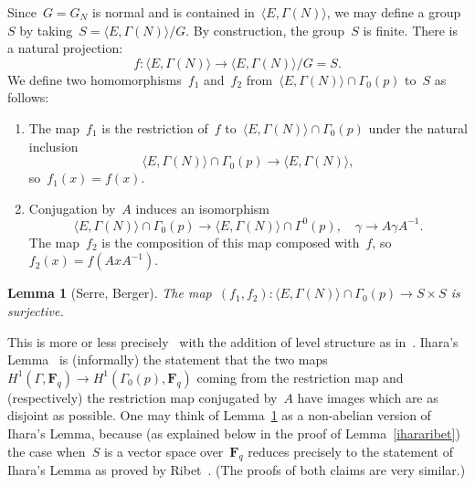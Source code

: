 \documentclass[10pt]{amsart}
\def\F{\mathbf{F}}
\newtheorem{lemma}[subsubsection]{Lemma}
\theoremstyle{remark}
\numberwithin{equation}{subsection}
\begin{document}
Since~$G = G_N$ is normal and is contained in~$\langle E,\Gamma(N)\rangle$, 
we may define a group~$S$ by taking~$S = \langle E,\Gamma(N) \rangle/G$.
By construction, the group~$S$
is finite.  There is a natural projection:
$$f:\langle E,\Gamma(N) \rangle \rightarrow \langle E,\Gamma(N) \rangle/G = S.$$
We define
 two homomorphisms~$f_1$ and~$f_2$ from~$\langle E,\Gamma(N) \rangle  \cap \Gamma_0(p)$ to~$S$ as follows:
\begin{enumerate}
\item The map~$f_1$ is the restriction of~$f$ to~$\langle E,\Gamma(N) \rangle  \cap \Gamma_0(p)$ under the natural
inclusion
$$\langle E,\Gamma(N) \rangle  \cap \Gamma_0(p) \rightarrow \langle E,\Gamma(N) \rangle,$$
so~$f_1(x) = f(x)$.
\item Conjugation by~$A$ induces an isomorphism
$$ \langle E,\Gamma(N) \rangle  \cap \Gamma_0(p) \rightarrow  \langle E,\Gamma(N) \rangle  \cap \Gamma^0(p), \quad
\gamma \longrightarrow A \gamma A^{-1}. $$
The map~$f_2$ is the composition of this map composed with~$f$, so~$f_2(x) = f(AxA^{-1})$. 
\end{enumerate}


\begin{lemma}[Serre, Berger] \label{serreberger}
The map~$(f_1,f_2): \langle E, \Gamma(N)\rangle \cap \Gamma_0(p) \rightarrow S \times S$
is surjective.
\end{lemma}

This is more or less precisely~\cite[Theorem~3]{SerreThompson}
with the addition of
level structure  as in~\cite{Berger}. Ihara's Lemma~\cite{RibetICM} is (informally) the statement
that the two maps~$H^1(\Gamma,\F_q) \rightarrow H^1(\Gamma_0(p),\F_q)$ coming from the restriction map
and (respectively) the restriction map conjugated by~$A$ have images which are as disjoint as possible.
One may think of Lemma~\ref{serreberger}
as a non-abelian version of Ihara's Lemma, because (as explained below
in the proof of Lemma~\ref{ihararibet}) the
case when~$S$ is a vector space over~$\F_q$ reduces precisely to the statement
of Ihara's Lemma as proved by Ribet~\cite{RibetICM}. (The proofs of both
claims are very similar.)
\end{document}
